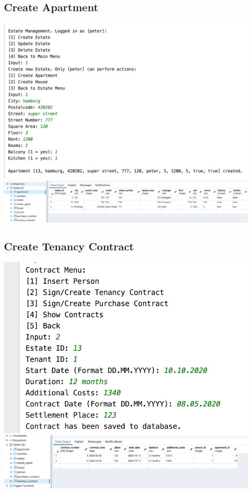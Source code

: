 \documentclass[ngerman]{dis-template-add}
\begin{document}
\subsection*{Create Apartment}
\includegraphics[scale=.5]{estate_app} \\
\includegraphics[scale=.3]{estate_db}

\subsection*{Create Tenancy Contract}
\includegraphics[scale=.5]{contract_app} \\
\includegraphics[scale=.4]{contract_db} \\ \\
\end{document}
